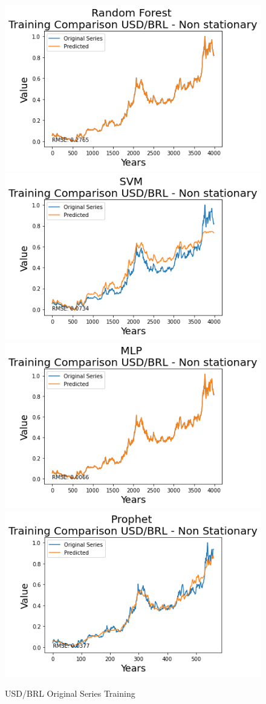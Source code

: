 \documentclass[10pt,twocolumn,letterpaper]{article}
\begin{document}
	\begin{figure}[h]
		\centering
		\includegraphics[width=0.45\linewidth]{../img/RandomForest/usd_brl_training}
		\includegraphics[width=0.45\linewidth]{../img/SVM/usd_brl_training}
		\includegraphics[width=0.45\linewidth]{../img/MLP/usd_brl_training}
		\includegraphics[width=0.45\linewidth]{../img/Prophet/usd_brl_training}
		\caption{USD/BRL Original Series Training}
		\label{fig:usd_brltraining}
	\end{figure}
	
\end{document}
